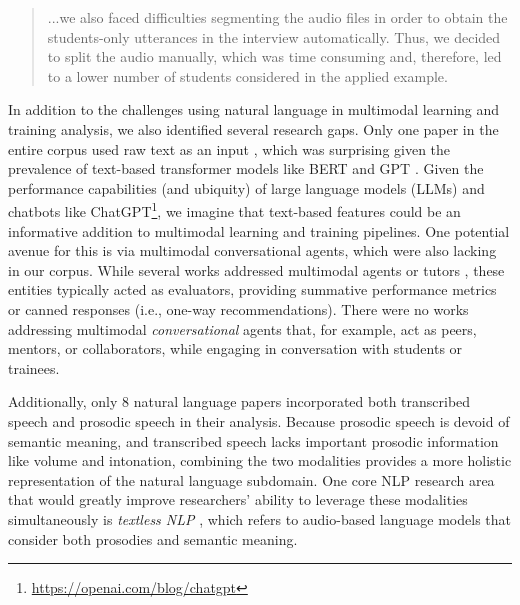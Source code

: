 \documentclass[manuscript,screen,review]{acmart}
\begin{document}
\begin{quote}
    ...we also faced difficulties segmenting the audio files in order to obtain the students-only utterances in the interview automatically. Thus, we decided to split the audio manually, which was time consuming and, therefore, led to a lower number of students considered in the applied example. \cite{32184286}
\end{quote}

In addition to the challenges using natural language in multimodal learning and training analysis, we also identified several research gaps. Only one paper in the entire corpus used raw text as an input \cite{666050348}, which was surprising given the prevalence of text-based transformer models like BERT \cite{devlin2018bert} and GPT \cite{radford2019language,brown2020language}. Given the performance capabilities (and ubiquity) of large language models (LLMs) and chatbots like ChatGPT\footnote{\href{https://openai.com/blog/chatgpt}{https://openai.com/blog/chatgpt}}, we imagine that text-based features could be an informative addition to multimodal learning and training pipelines. One potential avenue for this is via multimodal conversational agents, which were also lacking in our corpus. While several works addressed multimodal agents or tutors \cite{3093310941,3783339081,1576545447}, these entities typically acted as evaluators, providing summative performance metrics or canned responses (i.e., one-way recommendations). There were no works addressing multimodal \textit{conversational} agents that, for example, act as peers, mentors, or collaborators, while engaging in conversation with students or trainees.

Additionally, only 8 natural language papers incorporated both transcribed speech and prosodic speech in their analysis. Because prosodic speech is devoid of semantic meaning, and transcribed speech lacks important prosodic information like volume and intonation, combining the two modalities provides a more holistic representation of the natural language subdomain. One core NLP research area that would greatly improve researchers' ability to leverage these modalities simultaneously is \textit{textless NLP} \cite{lakhotia2021generative}, which refers to audio-based language models that consider both prosodies and semantic meaning.
\end{document}
